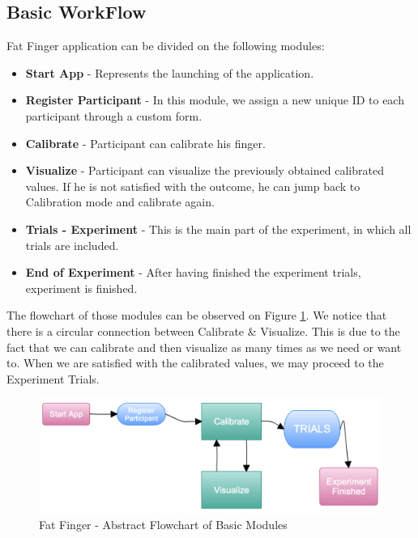 \subsection{Basic WorkFlow}
 
 Fat Finger application can be divided on the following modules:

 \begin{itemize}
\item \textbf{Start App} - Represents the launching of the application. 
\item \textbf{Register Participant} - In this module, we assign a new unique ID to each participant through a custom form.
\item \textbf{Calibrate} - Participant can calibrate his finger.
\item \textbf{Visualize} - Participant can visualize the previously obtained calibrated values. If he is not satisfied with the outcome, he can jump back to Calibration mode and calibrate again.
\item \textbf{Trials - Experiment} - This is the main part of the experiment, in which all trials are included.
\item \textbf{End of Experiment} - After having finished the experiment trials, experiment is finished.
 \end{itemize}

 The flowchart of those modules can be observed on Figure \ref{fig:FFBasicFlow}. We notice that there is a circular connection between Calibrate \& Visualize. This is due to the fact that we can calibrate and then visualize as many times as we need or want to. When we are satisfied with the calibrated values, we may proceed to the Experiment Trials. 

 \begin{figure}[h]
\centering
\includegraphics[width=\textwidth]{figures/FFBasicFlow.png}
\caption{Fat Finger - Abstract Flowchart of Basic Modules}
\label{fig:FFBasicFlow}
\end{figure}


